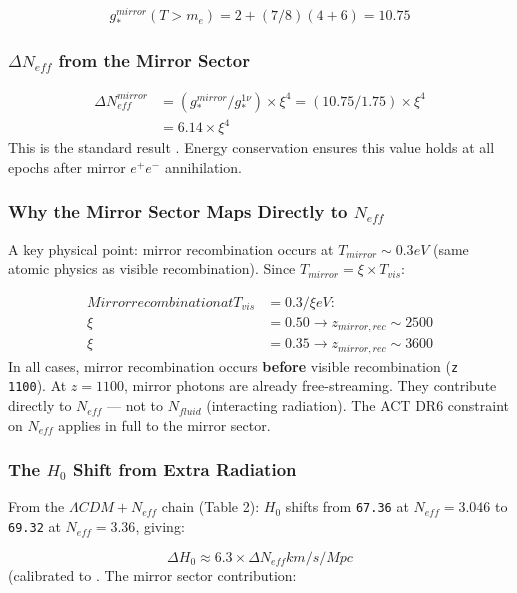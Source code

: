 \documentclass[aps,prd,preprint,superscriptaddress,longbibliography,floatfix]{revtex4-2}
\theoremstyle{remark}
\begin{document}
\begin{equation}
    g_*^{mirror}(T > m_e) = 2 + (7/8)(4 + 6) = 10.75
\end{equation}

\subsubsection{$\Delta N_{eff}$ from the Mirror Sector}


\begin{align}
    \Delta N_{eff}^{mirror} &= (g_*^{mirror} / g_*^{1\nu}) \times \xi^{4} = (10.75/1.75) \times \xi^{4} \\
    & = 6.14 \times \xi^{4}
\end{align}
This is the standard result \cite{Berezhiani2005}. Energy conservation ensures this value holds at all epochs after mirror $e^{+}e^{-}$ annihilation.


\subsubsection{Why the Mirror Sector Maps Directly to $N_{eff}$}

A key physical point: mirror recombination occurs at $T_{mirror} \sim  0.3 eV$ (same atomic physics as visible recombination). Since $T_{mirror} = \xi \times T_{vis}$:


\begin{align}
    Mirror recombination at T_{vis} &= 0.3/\xi eV: \\
    \xi &= 0.50 \to z_{mirror,rec} \sim  2500 \\
    \xi &= 0.35 \to z_{mirror,rec} \sim  3600
\end{align}
In all cases, mirror recombination occurs \textbf{before} visible recombination (\texttt{z ~ 1100}). At $z = 1100$, mirror photons are already free-streaming. They contribute directly to $N_{eff}$ --- not to $N_{fluid}$ (interacting radiation). The ACT DR6 constraint on $N_{eff}$ applies in full to the mirror sector.


\subsubsection{The $H_{0}$ Shift from Extra Radiation}

From the \cite{Planck2018_VI} $\Lambda CDM+N_{eff}$ chain (Table 2): $H_{0}$ shifts from \texttt{67.36} at $N_{eff} = 3.046$ to \texttt{69.32} at $N_{eff} = 3.36$, giving:


\begin{equation}
    \Delta H_{0} \approx 6.3 \times \Delta N_{eff}   km/s/Mpc
\end{equation}
(calibrated to \cite{BernalVerdeRiess2016}. The mirror sector contribution:
\end{document}
